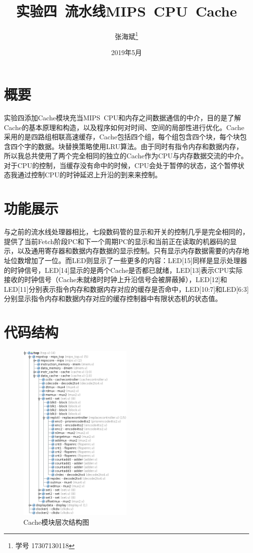 \documentclass[12pt,a4paper]{article}
\title{实验四~流水线MIPS~CPU~Cache}
\author{张海斌\thanks{学号 17307130118}}
\begin{document}
\date{2019年5月}

\maketitle

\renewcommand\contentsname{目~录}
\tableofcontents

\section{概要}

实验四添加Cache模块充当MIPS~CPU和内存之间数据通信的中介，目的是了解Cache的基本原理和构造，以及程序如何对时间、空间的局部性进行优化。Cache采用的是四路组相联高速缓存，Cache包括四个组，每个组包含四个块，每个块包含四个字的数据。块替换策略使用LRU算法。由于同时有指令内存和数据内存，所以我总共使用了两个完全相同的独立的Cache作为CPU与内存数据交流的中介。对于CPU的控制，当缓存没有命中的时候，CPU会处于暂停的状态，这个暂停状态我通过控制CPU的时钟延迟上升沿的到来来控制。

\section{功能展示}

与之前的流水线处理器相比，七段数码管的显示和开关的控制几乎是完全相同的，提供了当前Fetch阶段PC和下一个周期PC的显示和当前正在读取的机器码的显示，以及通用寄存器和数据内存数据的显示控制。只有显示内存数据需要的内存地址位数增加了一位。而LED则显示了一些更多的内容：LED[15]同样是显示处理器的时钟信号，LED[14]显示的是两个Cache是否都已就绪，LED[13]表示CPU实际接收的时钟信号（Cache未就绪时时钟上升沿信号会被屏蔽掉），LED[12]和LED[11]分别表示指令内存和数据内存对应的缓存是否命中，LED[10:7]和LED[6:3]分别显示指令内存和数据内存对应的缓存控制器中有限状态机的状态值。

\section{代码结构}

\begin{figure}[htbp]
	\centering
	\includegraphics[width=0.5\textwidth]{cache-struct}
	\caption{Cache模块层次结构图}
	\label{fig:struct}
\end{figure}
\end{document}

